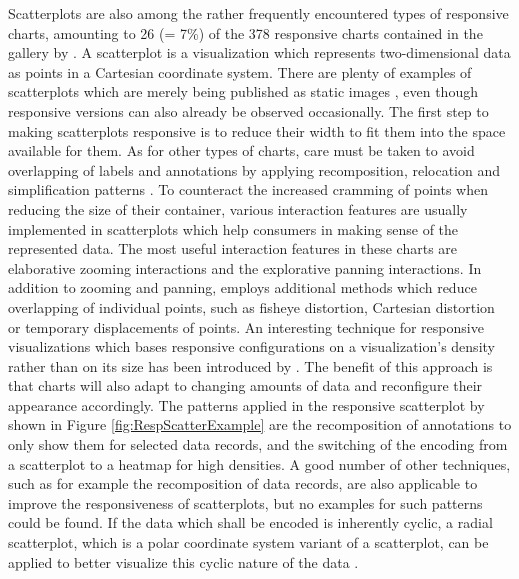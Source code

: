 Scatterplots are also among the rather frequently encountered types of responsive charts, amounting to 26 (= 7\%) of the 378 responsive charts contained in the gallery by \cite{DesignPatternsTradeOffsRespVis}.
A scatterplot is a visualization which represents two-dimensional data as points in a Cartesian coordinate system.
There are plenty of examples of scatterplots which are merely being published as static images \parencite{Scatter,Scatter2}, even though responsive versions can also already be observed occasionally.
The first step to making scatterplots responsive is to reduce their width to fit them into the space available for them.
As for other types of charts, care must be taken to avoid overlapping of labels and annotations by applying recomposition, relocation and simplification patterns \parencite{RespScatter,RespScatter2}.
To counteract the increased cramming of points when reducing the size of their container, various interaction features are usually implemented in scatterplots which help consumers in making sense of the represented data.
The most useful interaction features in these charts are elaborative zooming interactions and the explorative panning interactions.
In addition to zooming and panning, \cite{RespVis} employs additional methods which reduce overlapping of individual points, such as fisheye distortion, Cartesian distortion or temporary displacements of points.
An interesting technique for responsive visualizations which bases responsive configurations on a visualization's density rather than on its size has been introduced by \cite{NickRabinowitzRDV}.
The benefit of this approach is that charts will also adapt to changing amounts of data and reconfigure their appearance accordingly.
The patterns applied in the responsive scatterplot by \cite{NickRabinowitzRDV} shown in Figure \ref{fig:RespScatterExample} are the recomposition of annotations to only show them for selected data records, and the switching of the encoding from a scatterplot to a heatmap for high densities.
A good number of other techniques, such as for example the recomposition of data records, are also applicable to improve the responsiveness of scatterplots, but no examples for such patterns could be found.
If the data which shall be encoded is inherently cyclic, a radial scatterplot, which is a polar coordinate system variant of a scatterplot, can be applied to better visualize this cyclic nature of the data \parencite{RespRadialScatterHLine}. 

